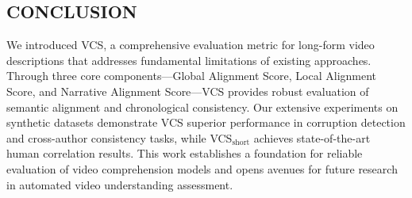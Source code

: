 \documentclass[main.tex]{subfiles}
\begin{document}
\subsection{CONCLUSION}

We introduced VCS, a comprehensive evaluation metric for long-form video descriptions that addresses fundamental limitations of existing approaches. Through three core components—Global Alignment Score, Local Alignment Score, and Narrative Alignment Score—VCS provides robust evaluation of semantic alignment and chronological consistency. Our extensive experiments on synthetic datasets demonstrate VCS superior performance in corruption detection and cross-author consistency tasks, while VCS$_{\text{short}}$ achieves state-of-the-art human correlation results. This work establishes a foundation for reliable evaluation of video comprehension models and opens avenues for future research in automated video understanding assessment.
\end{document}
